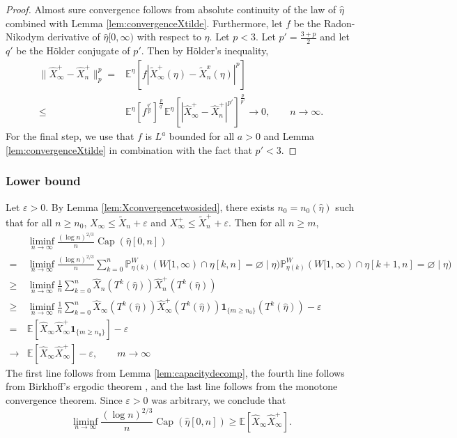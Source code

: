 \documentclass{article}
\DeclareMathOperator{\Ca}{Cap}
\renewcommand{\P}{\mathbb{P}}
\newcommand{\E}{\mathbb{E}}
\newcommand{\1}{\mathbf{1}}
\newcommand{\heta}{\hat\eta}
\theoremstyle{definition}
\numberwithin{equation}{section}
\numberwithin{theorem}{section}
\begin{document}
\begin{proof}
Almost sure convergence follows from absolute continuity of the law of $\hat{\eta}$ combined with Lemma \ref{lem:convergenceXtilde}. Furthermore, let $f$ be the Radon-Nikodym derivative of $\heta[0,\infty)$ with respect to $\eta$. Let $p<3$. Let $p'=\frac{3+p}{2}$ and let $q'$ be the H\"older conjugate of $p'$. Then by H\"older's inequality,
\begin{equation}
	\begin{split}
		\|\hat{X}_\infty^+-\hat{X}_n^+\|^p_p=&\E^{\eta}[f|\widetilde{X}_\infty^+(\eta)-\widetilde{X}_n^x(\eta)|^p]\\
		\leq&\E^{\eta}\left[f^{\frac{q'}{p}}\right]^{\frac{p}{q'}}\E^{\eta}\left[|\hat{X}_{\infty}^+-\hat{X}_{n}^+|^{p'}\right]^{\frac{p}{p'}}\rightarrow0,\qquad n\rightarrow\infty.
	\end{split}
\end{equation}
For the final step, we use that $f$ is $L^a$ bounded for all $a>0$ and Lemma \ref{lem:convergenceXtilde} in combination with the fact that $p'<3$.
\end{proof}





\subsubsection{Lower bound}
Let $\varepsilon>0$. By Lemma \ref{lem:Xconvergencetwosided}, there exists $n_0=n_0(\heta)$ such that for all $n\geq n_0$, $X_\infty\leq\widetilde{X}_n+\varepsilon$ and $X^+_\infty\leq\widetilde{X}^+_n+\varepsilon$. Then for all $n\geq m$,
\begin{equation}
    \begin{split}
        &\liminf_{n\rightarrow\infty}\frac{(\log n)^{2/3}}{n}\Ca(\heta[0,n])\\
      	=&\liminf_{n\rightarrow\infty}\frac{(\log n)^{2/3}}{n}\sum_{k=0}^n\P^W_{\eta(k)}(W[1,\infty)\cap\eta[k,n]=\varnothing\mid\eta)\P^W_{\eta(k)}(W[1,\infty)\cap\eta[k+1,n]=\varnothing\mid\eta)\\
        \geq&\liminf_{n\rightarrow\infty}\frac{1}{n}\sum_{k=0}^n\hat{X}_n(T^k(\heta))\hat{X}_n^+(T^k(\heta))\\
        \geq&\liminf_{n\rightarrow\infty}\frac{1}{n}\sum_{k=0}^n\hat{X}_\infty(T^k(\heta))\hat{X}_\infty^+(T^k(\heta))\1_{\{m\geq n_0\}}(T^k(\heta))-\varepsilon\\
        =&\E[\hat X_\infty \hat X_{\infty}^+\1_{\{m\geq n_0\}}]-\varepsilon\\
        \rightarrow&\E[\hat X_\infty\hat X^+_\infty]-\varepsilon,\qquad m\rightarrow\infty
    \end{split}
\end{equation}
The first line follows from Lemma \ref{lem:capacitydecomp}, the fourth line follows from Birkhoff's ergodic theorem \cite[Theorem 24.1]{billingsley1995probability}, and the last line follows from the monotone convergence theorem. Since $\varepsilon>0$ was arbitrary, we conclude that
\begin{equation}
	\liminf_{n\rightarrow\infty}\frac{(\log n)^{2/3}}{n}\Ca(\heta[0,n])\geq\E[\hat X_\infty\hat X^+_\infty].
\end{equation}
\end{document}
